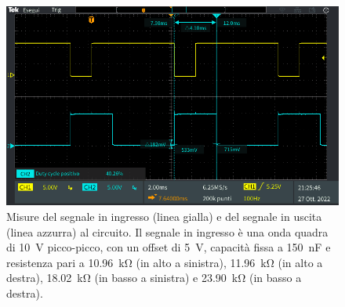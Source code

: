 \begin{figure}[h]
\begin{minipage}{.496\textwidth}
	\end{minipage}
	\begin{minipage}{.496\textwidth}
		\includegraphics[width=\linewidth]{./ImageFiles/Laboratorio 4/TEK00020.PNG}
	\end{minipage}
	\caption{Misure del segnale in ingresso (linea gialla) e del segnale in uscita (linea azzurra) al circuito. Il segnale in ingresso è una onda quadra di \SI{10}{\volt} picco-picco, con un offset di \SI{5}{\volt}, capacità fissa a \SI{150}{\nano\farad} e resistenza pari a \SI{10,96}{\kilo\ohm} (in alto a sinistra), \SI{11,96}{\kilo\ohm} (in alto a destra), \SI{18,02}{\kilo\ohm} (in basso a sinistra) e \SI{23,90}{\kilo\ohm} (in basso a destra).}
	\label{fig:uscita_circuito_150n}
\end{figure}

